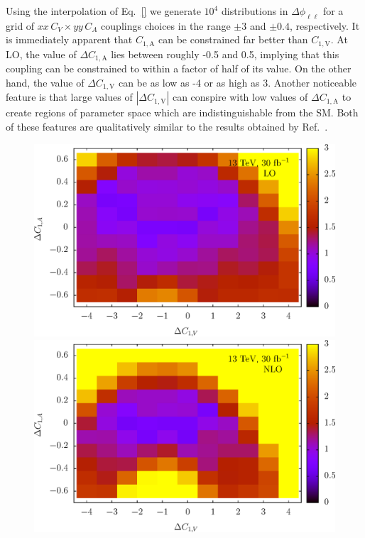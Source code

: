 \documentclass[preprint]{JHEP3}
\def\ConeA{C_{1,\mathrm{A}}}
\def\ConeV{C_{1,\mathrm{V}}}
\def\DConeA{\Delta C_{1,\mathrm{A}}}
\def\DConeV{\Delta C_{1,\mathrm{V}}}
\begin{document}
Using the interpolation of Eq.~\ref{} we generate $10^4$ distributions in $\Delta \phi_{\ell\ell}$ for a grid of $xx \, C_V \times yy\, C_A$ couplings 
choices in the range $\pm 3$ and $\pm 0.4$, respectively. 
It is immediately apparent that $\ConeA$ can be constrained far better than $\ConeV$. 
At LO, the value of $\DConeA$ lies between roughly -0.5 and 0.5, implying that this coupling can be constrained to within a factor of half of its value. 
On the other hand, the value of $\DConeV$ can be as low as -4 or as high as 3. Another noticeable feature is that large values of $| \DConeV |$ can conspire 
with low values of $\DConeA$ to create regions of parameter space which are indistinguishable from the SM. 
Both of these features are qualitatively similar to the results obtained by Ref.~\cite{Baur:2004uw}. 
\begin{figure}[t]
\includegraphics[scale=0.5]{LHC_53_LLSign_13LO30.eps} 
\includegraphics[scale=0.5]{LHC_53_LLSign_13NLO30.eps} 

\end{figure}
\end{document}
